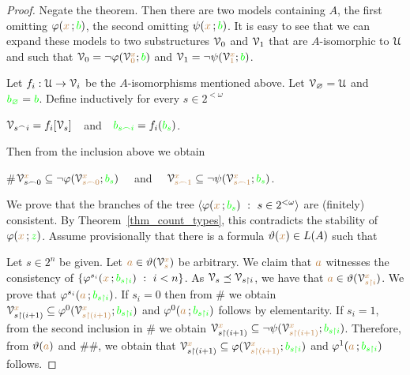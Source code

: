 \begin{proof}
  Negate the theorem. 
  Then there are two models containing $A$, the first omitting $\varphi({\color{brown} x}\,;{\color{green} b})$, the second omitting $\psi({\color{brown} x}\,;{\color{green} b})$.
  It is easy to see that we can expand these models to two substructures $\EuScript V_0$ and $\EuScript V_1$ that are $A$-isomorphic to $\EuScript U$ and such that $\EuScript V_0=\neg\varphi(\EuScript V_0^{\color{brown} x};{\color{green} b})$ and $\EuScript V_1=\neg\psi(\EuScript V_1^{\color{brown} x};{\color{green} b})$.

  Let $f_i:\EuScript U\to\EuScript V_i$ be the $A$-isomorphisms mentioned above. 
  Let $\EuScript V_\varnothing=\EuScript U$ and ${\color{green} b_\varnothing}={\color{green} b}$.
  Define inductively for every $s\in 2^{<\omega}$ 

  \hfil$\EuScript V_{s^\frown i}=f_i[\EuScript V_s]$\ \ and\ \ ${\color{green} b_{s\frown i}}=f_i({\color{green} b_s})$.

  Then from the inclusion above we obtain

  \#\hfil$\EuScript V_{s\frown0}^{{\color{brown} x}}\subseteq\neg\varphi(\EuScript V_{s\frown0}^{\color{brown} x};{\color{green} b_s})$ \ \ and \ \  $\EuScript V_{s\frown1}^{\color{brown} x}\subseteq\neg\psi(\EuScript V_{s\frown1}^{\color{brown} x};{\color{green} b_s})$.

  We prove that the branches of the tree $\<\phi({\mr x}\,;{\gr b_s})\ :\  s\in2^{<\omega}\>$ are (finitely) consistent. 
  By Theorem~\ref{thm_count_types}, this contradicts the stability of $\varphi({\color{brown} x}\,;{\color{green} z})$.
  Assume provisionally that there is a formula $\vartheta({\color{brown} x})\in L(A)$ such that
  
  
  Let $s\in2^n$ be given.
  Let ${\color{brown} a}\in\vartheta(\EuScript V_s^{\color{brown} x})$ be arbitrary. We claim that ${\color{brown} a}$ witnesses the consistency of $\{\phi^{s_i}({\mr x}\,;{\gr b_{s\restriction i}})\ :\ i<n\}$.
  As $\EuScript V_s\preceq\EuScript V_{s\restriction i}$, we have that ${\color{brown} a}\in\vartheta(\EuScript V_{s\restriction i}^{\color{brown} x})$.
  We prove that $\varphi^{s_i}({\color{brown} a}\,;{\color{green} b_{s\restriction i}})$.
  If $s_i=0$ then from \# we obtain $\EuScript V_{s\restriction(i+1)}^{{\color{brown} x}}\subseteq\varphi^0(\EuScript V_{s\restriction(i+1)}^{\color{brown} x};{\color{green} b_{s\restriction i}})$ and $\varphi^0({\color{brown} a}\,;{\color{green} b_{s\restriction i}})$ follows by elementarity.
  If $s_i=1$, from the second inclusion in \# we obtain $\EuScript V_{s\restriction(i+1)}^{{\color{brown} x}}\subseteq\neg\psi(\EuScript V_{s\restriction(i+1)}^{\color{brown} x};{\color{green} b_{s\restriction i}})$.
  Therefore, from $\vartheta({\color{brown} a})$ and \#\#, we obtain that $\EuScript V_{s\restriction(i+1)}^{{\color{brown} x}}\subseteq\varphi(\EuScript V_{s\restriction(i+1)}^{\color{brown} x};{\color{green} b_{s\restriction i}})$ and $\varphi^1({\color{brown} a}\,;{\color{green} b_{s\restriction i}})$ follows.


\end{proof}
